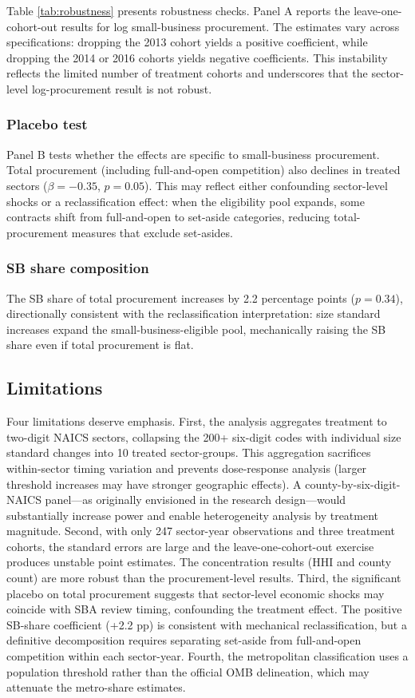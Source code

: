 \documentclass[12pt]{article}
\begin{document}


Table \ref{tab:robustness} presents robustness checks. Panel A reports the leave-one-cohort-out results for log small-business procurement. The estimates vary across specifications: dropping the 2013 cohort yields a positive coefficient, while dropping the 2014 or 2016 cohorts yields negative coefficients. This instability reflects the limited number of treatment cohorts and underscores that the sector-level log-procurement result is not robust.

\subsubsection*{Placebo test} Panel B tests whether the effects are specific to small-business procurement. Total procurement (including full-and-open competition) also declines in treated sectors ($\beta = -0.35$, $p = 0.05$). This may reflect either confounding sector-level shocks or a reclassification effect: when the eligibility pool expands, some contracts shift from full-and-open to set-aside categories, reducing total-procurement measures that exclude set-asides.

\subsubsection*{SB share composition} The SB share of total procurement increases by 2.2 percentage points ($p = 0.34$), directionally consistent with the reclassification interpretation: size standard increases expand the small-business-eligible pool, mechanically raising the SB share even if total procurement is flat.

\subsection{Limitations}

Four limitations deserve emphasis. First, the analysis aggregates treatment to two-digit NAICS sectors, collapsing the 200+ six-digit codes with individual size standard changes into 10 treated sector-groups. This aggregation sacrifices within-sector timing variation and prevents dose-response analysis (larger threshold increases may have stronger geographic effects). A county-by-six-digit-NAICS panel---as originally envisioned in the research design---would substantially increase power and enable heterogeneity analysis by treatment magnitude. Second, with only 247 sector-year observations and three treatment cohorts, the standard errors are large and the leave-one-cohort-out exercise produces unstable point estimates. The concentration results (HHI and county count) are more robust than the procurement-level results. Third, the significant placebo on total procurement suggests that sector-level economic shocks may coincide with SBA review timing, confounding the treatment effect. The positive SB-share coefficient (+2.2 pp) is consistent with mechanical reclassification, but a definitive decomposition requires separating set-aside from full-and-open competition within each sector-year. Fourth, the metropolitan classification uses a population threshold rather than the official OMB delineation, which may attenuate the metro-share estimates.
\end{document}
